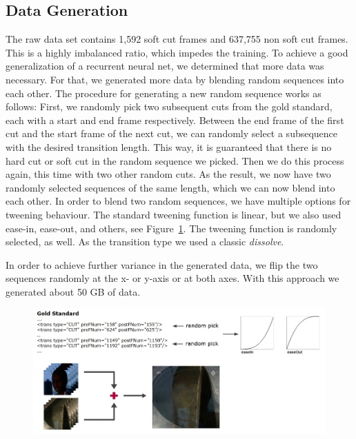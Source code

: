 \subsection{Data Generation}
\label{sec:soft_cut_data_generation}

The raw data set contains 1,592 soft cut frames and 637,755 non soft cut frames.
This is a highly imbalanced ratio, which impedes the training.
To achieve a good generalization of a recurrent neural net, we determined that more data was necessary.
For that, we generated more data by blending random sequences into each other.
The procedure for generating a new random sequence works as follows:
First, we randomly pick two subsequent cuts from the gold standard, each with a start and end frame respectively.
Between the end frame of the first cut and the start frame of the next cut, we can randomly select a subsequence with the desired transition length.
This way, it is guaranteed that there is no hard cut or soft cut in the random sequence we picked.
Then we do this process again, this time with two other random cuts.
As the result, we now have two randomly selected sequences of the same length, which we can now blend into each other.
In order to blend two random sequences, we have multiple options for tweening behaviour.
The standard tweening function is linear, but we also used ease-in, ease-out, and others, see Figure~\ref{fig:data_generation}.
The tweening function is randomly selected, as well.
As the transition type we used a classic \textit{dissolve}.

In order to achieve further variance in the generated data, we flip the two sequences randomly at the x- or y-axis or at both axes.
With this approach we generated about 50 GB of data.

\begin{figure}
    \centering
    \includegraphics[scale=.5]{images/data_generation.jpg}
    \caption{}
    \label{fig:data_generation}
\end{figure}
